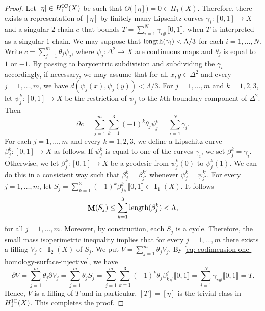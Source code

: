\documentclass{amsart}
\numberwithin{equation}{section}
\DeclareMathOperator{\bI}{\mathbf{I}}
\DeclareMathOperator{\bM}{\mathbf{M}}
\newcommand{\bb}[1]{\llbracket #1\rrbracket}
\begin{document}
        \begin{proof}
            Let $[\eta]\in H_1^\textup{IC}(X)$ be such that $\Theta\big([\eta]\big)= 0 \in H_1(X)$. Therefore, there exists a representation of $[\eta]$ by finitely many Lipschitz curves $\gamma_i\colon [0,1]\to X$ and a singular $2$-chain $c$ that bounds $T =\sum_{i=1}^N \gamma_{i\#}\bb{0,1}$, when $T$ is interpreted as a singular $1$-chain. We may suppose that $\textup{length}(\gamma_i)<\Lambda/3$ for each $i =1,\dots, N$. Write  $c = \sum_{j=1}^m \theta_j \psi_j$, where $\psi_j \colon \Delta^2 \to X$ are continuous maps and $\theta_j$ is equal to $1$ or $-1$. By passing to barycentric subdivision and subdividing the $\gamma_i$ accordingly, if necessary, we may assume that for all $x,y \in \Delta^2$ and every $j =1,\dots,m$, we have $d(\psi_j(x),\psi_j(y))< \Lambda/3$. For $j =1,\dots,m$ and $k=1,2,3$, let $\psi_j^k\colon [0,1]\to X$ be the restriction of $\psi_j$ to the $k$th boundary component of $\Delta^2$. Then 
            \begin{equation}\label{eq: codimension-one-homology-surface-injective}
                \partial c = \sum_{j=1}^m \sum_{k=1}^3 (-1)^k  \theta_j \psi_j^k = \sum_{i=1}^N \gamma_i.
            \end{equation}
            For each $j =1,\dots,m$ and every $k=1,2,3$, we define a Lipschitz curve $\beta_j^k\colon [0,1]\to X$ as follows. If $\psi_j^k$ is equal to one of the curves $\gamma_i$, we set $\beta_j^k = \gamma_i$. Otherwise, we let $\beta_j^k\colon[0,1]\to X $ be a geodesic from $\psi^k_j(0)$ to $\psi^k_j(1)$. We can do this in a consistent way such that $\beta_j^k = \beta_{j'}^{k'}$ whenever $\psi^k_j = \psi_{j'}^{k'}$. For  every $j = 1,\dots,m$, let $S_j = \sum_{k=1}^3 (-1)^k \beta_{j\#}^k\bb{0,1}\in \bI_1(X)$. It follows
            $$\bM(S_j) \leq \sum_{k=1}^3 \textup{length}(\beta_j^k) < \Lambda,$$
            for all $j = 1,\dots,m$. Moreover, by construction, each $S_j$ is a cycle. Therefore, the small mass isoperimetric inequality implies that for every $j = 1,\dots,m$ there exists a filling $V_j\in \bI_2(X)$ of $S_j$. We put $V = \sum_{j=1}^m \theta_j V_j$.  By \eqref{eq: codimension-one-homology-surface-injective}, we have
            $$\partial V = \sum_{j=1}^m\theta_j \partial V_j = \sum_{j=1}^m \theta_j S_j = \sum_{j=1}^m\sum_{k=1}^3 (-1)^k \theta_j \beta_{k\#}^j\bb{0,1} = \sum_{i=1}^N \gamma_{i\#}\bb{0,1} = T.$$
            Hence, $V$ is a filling of $T$ and in particular, $[T] = [\eta]$ is the trivial class in $H_1^\textup{IC}(X)$. This completes the proof.
        \end{proof}
        
\end{document}
